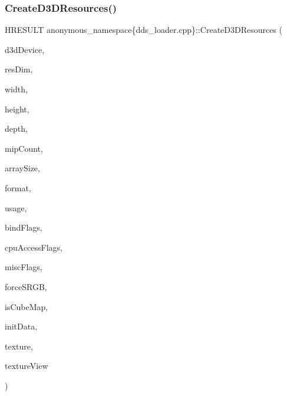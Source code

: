 \subsubsection{\texorpdfstring{Create\+D3\+D\+Resources()}{CreateD3DResources()}}
{\footnotesize\ttfamily H\+R\+E\+S\+U\+LT anonymous\+\_\+namespace\{dds\+\_\+loader.\+cpp\}\+::Create\+D3\+D\+Resources (\begin{DoxyParamCaption}\item[{\+\_\+\+In\+\_\+ I\+D3\+D11\+Device $\ast$}]{d3d\+Device,  }\item[{\+\_\+\+In\+\_\+ uint32\+\_\+t}]{res\+Dim,  }\item[{\+\_\+\+In\+\_\+ size\+\_\+t}]{width,  }\item[{\+\_\+\+In\+\_\+ size\+\_\+t}]{height,  }\item[{\+\_\+\+In\+\_\+ size\+\_\+t}]{depth,  }\item[{\+\_\+\+In\+\_\+ size\+\_\+t}]{mip\+Count,  }\item[{\+\_\+\+In\+\_\+ size\+\_\+t}]{array\+Size,  }\item[{\+\_\+\+In\+\_\+ D\+X\+G\+I\+\_\+\+F\+O\+R\+M\+AT}]{format,  }\item[{\+\_\+\+In\+\_\+ D3\+D11\+\_\+\+U\+S\+A\+GE}]{usage,  }\item[{\+\_\+\+In\+\_\+ unsigned int}]{bind\+Flags,  }\item[{\+\_\+\+In\+\_\+ unsigned int}]{cpu\+Access\+Flags,  }\item[{\+\_\+\+In\+\_\+ unsigned int}]{misc\+Flags,  }\item[{\+\_\+\+In\+\_\+ bool}]{force\+S\+R\+GB,  }\item[{\+\_\+\+In\+\_\+ bool}]{is\+Cube\+Map,  }\item[{\+\_\+\+In\+\_\+reads\+\_\+opt\+\_\+(mip\+Count $\ast$array\+Size) D3\+D11\+\_\+\+S\+U\+B\+R\+E\+S\+O\+U\+R\+C\+E\+\_\+\+D\+A\+TA $\ast$}]{init\+Data,  }\item[{\+\_\+\+Outptr\+\_\+opt\+\_\+ I\+D3\+D11\+Resource $\ast$$\ast$}]{texture,  }\item[{\+\_\+\+Outptr\+\_\+opt\+\_\+ I\+D3\+D11\+Shader\+Resource\+View $\ast$$\ast$}]{texture\+View }\end{DoxyParamCaption})}

\mbox{\label{namespaceanonymous__namespace_02dds__loader_8cpp_03_adff875e15c4c1a87a13da9cf502b0b34}} 
